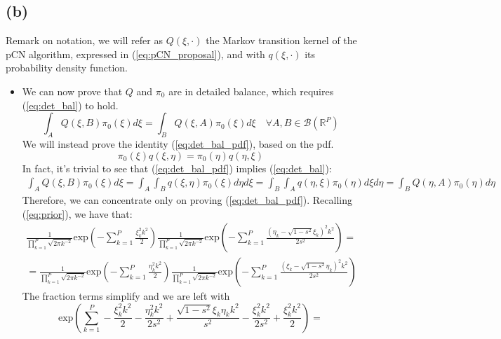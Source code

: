 \documentclass{article}
\begin{document}
\subsection*{(b)}
Remark on notation, we will refer as $Q(\xi, \cdot)$ the Markov transition kernel of the pCN algorithm, expressed in (\ref{eq:pCN_proposal}), and with $q(\xi, \cdot)$ its probability density function.\\
\begin{itemize}
    \item {
    We can now prove that $Q$ and $\pi_0$ are in detailed balance, which requires (\ref{eq:det_bal}) to hold.
    \begin{equation}
        \int_{A}  Q(\xi,B) \pi_0(\xi) d\xi = \int_{B}  Q(\xi, A) \pi_0(\xi) d\xi \quad \forall A,B \in \mathcal{B}(\mathbb{R}^P)
        \label{eq:det_bal}
    \end{equation}
    We will instead prove the identity (\ref{eq:det_bal_pdf}), based on the pdf. 
    \begin{equation}
        \pi_0(\xi) q(\xi,\eta) = \pi_0(\eta) q(\eta, \xi)
        \label{eq:det_bal_pdf}
    \end{equation}
    In fact, it's trivial to see that (\ref{eq:det_bal_pdf}) implies (\ref{eq:det_bal}):
    \begin{gather*}
        \int_{A}  Q(\xi,B) \pi_0(\xi) d\xi = \int_{A}  \int_{B} q(\xi,\eta) \pi_0(\xi) d\eta d\xi = \int_{B} \int_{A}  q(\eta,\xi) \pi_0(\eta) d\xi d\eta = \int_{B}  Q(\eta,A) \pi_0(\eta) d\eta
    \end{gather*}
    Therefore, we can concentrate only on proving (\ref{eq:det_bal_pdf}). Recalling (\ref{eq:prior}), we have that:
    \begin{gather*}
    \frac{1}{\prod_{k=1}^P \sqrt{2 \pi k^{-2}}} \text{exp}\left( - \sum_{k=1}^P \frac{\xi_k^2 k^2} {2} \right) \frac{1}{\prod_{k=1}^P \sqrt{2 \pi k^{-2}}}  \text{exp} \left( - \sum_{k=1}^P \frac{( \eta_k - \sqrt{1-s^2}\xi_k)^2 k^2 } {2s^2} \right) = \\ = \frac{1}{\prod_{k=1}^P \sqrt{2 \pi k^{-2}}} \text{exp}\left( - \sum_{k=1}^P \frac{\eta_k^{2} k^2} {2} \right) \frac{1}{\prod_{k=1}^P \sqrt{2 \pi k^{-2}}}  \text{exp} \left( - \sum_{k=1}^P \frac{( \xi_k - \sqrt{1-s^2}\eta_k)^2 k^2 } {2s^2} \right)
    \end{gather*}
    The fraction terms simplify and we are left with
    $$
    \text{exp} \left( \sum_{k=1}^P - \frac{\xi_k^2 k^2} {2} - \frac{ \eta^{2}_k k^2 } {2s^2} + \frac{\sqrt{1-s^2}\xi_k\eta_k k^2}{s^2} - \frac{ \xi^2_k k^2 } {2s^2} + \frac{ \xi^2_k k^2 } {2}\right) =  
$$}
\end{itemize}
\end{document}
